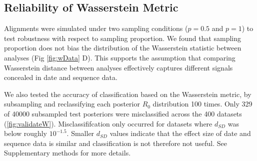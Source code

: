 \documentclass{article}
\begin{document}
\subsection*{Reliability of Wasserstein Metric}
Alignments were simulated under two sampling conditions ($p=0.5$ and $p=1$) to test robustness with respect to sampling proportion. We found that sampling proportion does not bias the distribution of the Wasserstein statistic between analyses (Fig \ref{fig:wData} D). This supports the assumption that comparing Wasserstein distance between analyses effectively captures different signals concealed in date and sequence data. 

We also tested the accuracy of classification based on the Wasserstein metric, by subsampling and reclassifying each posterior $R_0$ distribution 100 times. Only 329 of 40000 subsampled test posteriors were misclassified  across the 400 datasets (\ref{fig:validateW}). Misclassififcation only occurred for datasets where $d_{SD}$ was below roughly $10^{-1.5}$. Smaller $d_{SD}$ values indicate that the effect size of date and sequence data is similar and classification is not therefore not useful. See Supplementary methods for more details.
\end{document}
